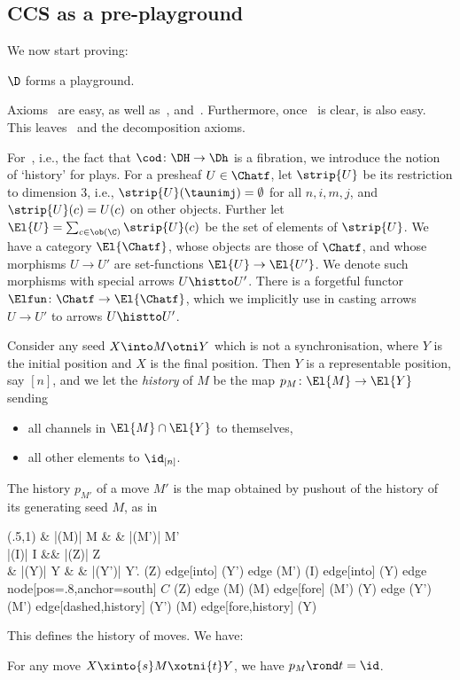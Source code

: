 \documentclass{LMCS}
\theoremstyle{plain}\newtheorem{satz}[thm]{Satz}
\begin{document}
\subsection{CCS as a pre-playground}
We now start proving:
\begin{thm}
 $\D$ forms a playground.
\end{thm}\label{thm:playground}
Axioms~ are easy, as well
as~, 
and~. Furthermore, once~ is
clear,  is also easy. This
leaves~ and the decomposition axioms.

For~, i.e., the fact that $\cod \colon \DH \to
\Dh$ is a fibration, we introduce the notion of `history' for plays.
For a presheaf $U \in \Chatf$, let $\strip{U}$ be its restriction to
dimension 3, i.e., $\strip{U}(\taunimj) = \emptyset$ for all $n,i,m,j$, and
$\strip{U}(c) = U(c)$ on other objects. Further let $\El{U} = \sum_{c \in
  \ob(\C)} \strip{U} (c)$ be the set of elements of $\strip{U}$. We
have a category $\El{\Chatf}$, whose objects are those of $\Chatf$,
and whose morphisms $U \to U'$ are set-functions $\El{U} \to
\El{U'}$. We denote such morphisms with special arrows $U \histto
U'$. There is a forgetful functor $\Elfun \colon \Chatf \to
\El{\Chatf}$, which we implicitly use in casting arrows $U \to U'$ to
arrows $U \histto U'$.
\begin{defi}
  Consider any seed $X \into M \otni Y$ which is not a
  synchronisation, where $Y$ is the initial position and $X$ is the
  final position.  Then $Y$ is a representable position, say $[n]$,
  and we let the \emph{history} of $M$ be the map $p_M \colon \El{M}
  \to \El{Y}$ sending
  \begin{itemize}
  \item all channels in $\El{M} \cap \El{Y}$ to themselves,
  \item all other elements to $\id_{[n]}$.
  \end{itemize}
  The history $p_{M'}$ of a move $M'$ is the map obtained by
  pushout of the history of its generating seed $M$, as in
  \begin{center}
    \Diag(.5,1){  }{\& |(M)| M \& \& |(M')| M'  \\
      |(I)| I \&\& |(Z)| Z \\
      \& |(Y)| Y \& \& |(Y')| Y'. }{(Z) edge[into] (Y') edge (M') (I) edge[into] (Y) edge node[pos=.8,anchor=south] {$C$} (Z) edge (M) (M) edge[fore] (M') (Y) edge (Y') (M') edge[dashed,history] (Y') (M) edge[fore,history] (Y) }
  \end{center}

\end{defi}
This defines the history of moves. We have:
\begin{prop}
  For any move $X \xinto{s} M \xotni{t} Y$, we have $p_M \rond t = \id$.
\end{prop}
\end{document}
